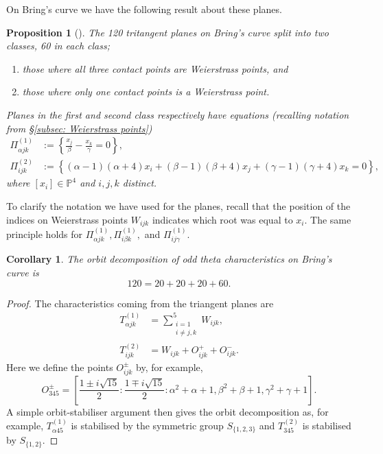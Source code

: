 \documentclass{amsart}
\newtheorem{corollary}[theorem]{Corollary}
\newtheorem{prop}[theorem]{Proposition}
\newcommand{\pbrace}[1]{\left\{ #1 \right\} }
\begin{document}
On Bring's curve we have the following result about these planes.
\begin{prop}[\cite{Edge1981}]
The 120 tritangent planes on Bring's curve split into two classes, 60 in each class;
\begin{enumerate}
    \item those where all three contact points are Weierstrass points, and 
    \item those where only one contact points is a Weierstrass point. 
\end{enumerate}
Planes in the first and second class respectively have equations (recalling notation from \S\ref{subsec: Weierstrass points})
\begin{align*}
\Pi_{\alpha  jk }^{(1)} &:= \pbrace{\frac{x_j}{\beta} - \frac{x_k}{\gamma} = 0 } , \\
\Pi_{ijk}^{(2)} &:= \pbrace{(\alpha-1)(\alpha+4)x_i + (\beta-1)(\beta+4)x_j + (\gamma-1)(\gamma+4)x_k =0 } , 
\end{align*}
where $[x_i] \in \mathbb{P}^4$ and $i,j,k$ distinct.
\end{prop}
To clarify the notation we have used for the planes, recall that the position of the indices on Weierstrass points $W_{ijk}$ indicates which root was equal to $x_i$. The same principle holds for $\Pi_{\alpha jk}^{(1)},  \Pi^{(1)}_{i \beta k},$ and $\Pi^{(1)}_{ij \gamma}$. 
\begin{corollary}\label{cor: Orbit decomposition of odd theta characteristics}
The orbit decomposition of odd theta characteristics on Bring's curve is \begin{equation}\label{eq:oddcharacteristics}
120=20+20+20+60 . 
\end{equation}
\end{corollary}
\begin{proof}
The characteristics coming from the triangent planes are 
\begin{align*}
T_{\alpha jk}^{(1)} &= \sum_{\substack{i=1 \\ i \neq j,k}}^5 W_{ijk}  , \\
T_{ijk}^{(2)} &= W_{ijk} + O_{ijk}^+ + O_{ijk}^-  . 
\end{align*}
Here we define the points $O_{ijk}^\pm$ by, for example, 
\[
O_{345}^\pm = \left [ \frac{1 \pm i\sqrt{15}}{2} : \frac{1 \mp i\sqrt{15}}{2} : \alpha^2 + \alpha + 1, \beta^2 + \beta + 1 , \gamma^2 + \gamma + 1 \right ] .
\]
A simple orbit-stabiliser argument then gives the orbit decomposition as, for example, $T_{\alpha 45}^{(1)}$ is stabilised by the symmetric group $S_{\{ 1,2,3 \}}$ and $T_{345}^{(2)}$ is stabilised by $S_{\{1,2\}}$. 
\end{proof}
\end{document}
